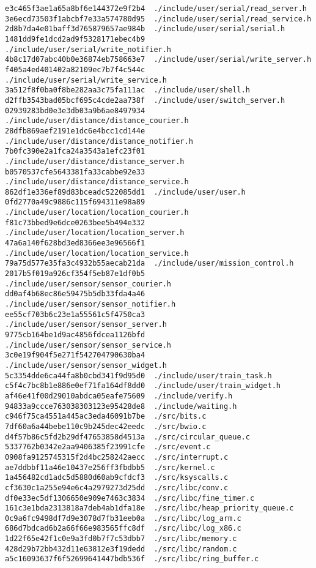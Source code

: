 \documentclass{article}
\begin{document}
\begin{verbatim}
e3c465f3ae1a65a8bf6e144372e9f2b4  ./include/user/serial/read_server.h
3e6ecd73503f1abcbf7e33a574780d95  ./include/user/serial/read_service.h
2d8b7da4e01baff3d765879657ae984b  ./include/user/serial/serial.h
1481dd9fe1dcd2ad9f5328171ebec4b9  ./include/user/serial/write_notifier.h
4b8c17d07abc40b0e36874eb758663e7  ./include/user/serial/write_server.h
f405a4ed401402a82109ec7b7f4c544c  ./include/user/serial/write_service.h
3a512f8f0ba0f8be282aa3c75fa111ac  ./include/user/shell.h
d2ffb3543bad05bcf695c4cde2aa738f  ./include/user/switch_server.h
02939283bd0e3e3db03a9b6ae8497934  ./include/user/distance/distance_courier.h
28dfb869aef2191e1dc6e4bcc1cd144e  ./include/user/distance/distance_notifier.h
7b0fc390e2a1fca24a3543a1efc23f01  ./include/user/distance/distance_server.h
b0570537cfe5643381fa33cabbe92e33  ./include/user/distance/distance_service.h
862df1e336ef89d83bceadc522085dd1  ./include/user/user.h
0fd2770a49c9886c115f694311e98a89  ./include/user/location/location_courier.h
f81c73bbed9e6dce0263bee5b494e332  ./include/user/location/location_server.h
47a6a140f628bd3ed8366ee3e96566f1  ./include/user/location/location_service.h
79a75d577e35fa3c4932b55aecab21da  ./include/user/mission_control.h
2017b5f019a926cf354f5eb87e1df0b5  ./include/user/sensor/sensor_courier.h
dd0af4b68ec86e59475b5db33fda4a46  ./include/user/sensor/sensor_notifier.h
ee55cf703b6c23e1a55561c5f4750ca3  ./include/user/sensor/sensor_server.h
9775cb164be1d9ac4856fdcea1126bfd  ./include/user/sensor/sensor_service.h
3c0e19f904f5e271f542704790630ba4  ./include/user/sensor/sensor_widget.h
5c3354dde6ca44fa8b0cbd341f9d95d0  ./include/user/train_task.h
c5f4c7bc8b1e886e0ef71fa164df8dd0  ./include/user/train_widget.h
af46e41f00d29010abdca05eafe75609  ./include/verify.h
94833a9ccce763038303123e95428de8  ./include/waiting.h
c946f75ca4551a445ac3eda46091b7be  ./src/bits.c
7df60a6a44bebe110c9b245dec42eedc  ./src/bwio.c
d4f57b86c5fd2b29df47653858d4513a  ./src/circular_queue.c
5337762b0342e2aa9406385f23991cfe  ./src/event.c
0908fa9125745315f2d4bc258242aecc  ./src/interrupt.c
ae7ddbbf11a46e10437e256ff3fbdbb5  ./src/kernel.c
1a456482cd1adc5d5880d60ab9cfdcf3  ./src/ksyscalls.c
cf3630c1a255e94e6c4a2979273d25dd  ./src/libc/conv.c
df0e33ec5df1306650e909e7463c3834  ./src/libc/fine_timer.c
161c3e1bda2313818a7deb4ab1dfa18e  ./src/libc/heap_priority_queue.c
0c9a6fc9498df7d9e3078d7fb31eeb0a  ./src/libc/log_arm.c
686d7bdcad6b2a66f66e983565ffc8df  ./src/libc/log_x86.c
1d22f65e42f1c0e9a3fd0b7f7c53dbb7  ./src/libc/memory.c
428d29b72bb432d11e63812e3f19dedd  ./src/libc/random.c
a5c16093637f6f52699641447bdb536f  ./src/libc/ring_buffer.c

\end{verbatim}
\end{document}
